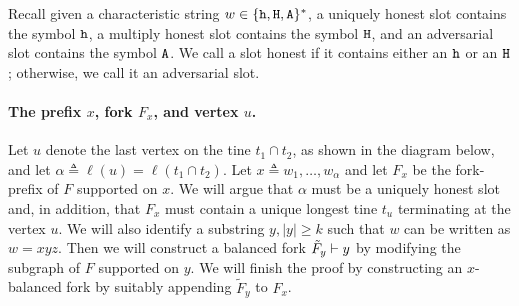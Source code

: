   Recall given a characteristic string $w \in \{\mathtt{h}, \mathtt{H}, \mathtt{A}\}^*$, 
  a uniquely honest slot contains the symbol $\mathtt{h}$, 
  a multiply honest slot contains the symbol $\mathtt{H}$, 
  and an adversarial slot contains the symbol $\mathtt{A}$.
  We call a slot honest if it contains either an $\mathtt{h}$ or an $\mathtt{H}$; 
  otherwise, we call it an adversarial slot. 

  \paragraph{The prefix $x$, fork $F_x$, and vertex $u$.} 
  Let $u$ denote the last vertex on the tine
  $t_1 \cap t_2$, as shown in the diagram below, and let
  $\alpha \triangleq \ell(u) = \ell(t_1 \cap t_2)$. 
  Let $x \triangleq w_1, \ldots, w_\alpha$ 
  and let $F_x$ be the fork-prefix of $F$ supported on $x$. 
  We will argue that $\alpha$ must be a uniquely honest slot and, 
  in addition, that 
  $F_x$ must contain a unique longest tine $t_u$ terminating 
  at the vertex $u$. 
  We will also identify a substring 
  $y, |y| \geq k$ 
  such that $w$ can be written as $w = xyz$. 
  Then we will construct a balanced fork $\tilde{F}_y \vdash y$ by 
  modifying the subgraph of $F$ supported on $y$. 
  We will finish the proof by constructing an $x$-balanced fork by 
  suitably appending $\tilde{F}_y$ to $F_x$.
    
  \begin{center}
    \end{center}

